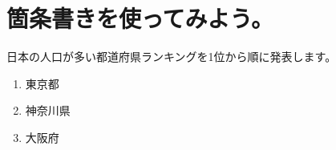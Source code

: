 \documentclass{ltjsarticle}
\begin{document}
\section{箇条書きを使ってみよう。}
日本の人口が多い都道府県ランキングを1位から順に発表します。
\begin{enumerate}[第1位]
\item
東京都
\item
神奈川県
\item
大阪府
\end{enumerate}
\end{document}
